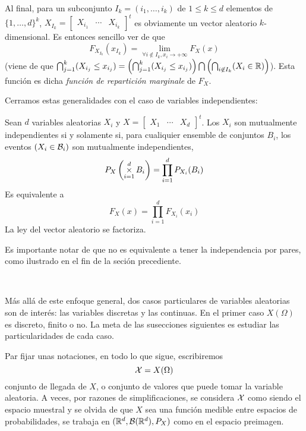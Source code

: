 %
Al  final, para  un subconjunto  $I_k =  (i_1,\ldots,i_k)$ de  $1 \le  k  \le d$
elementos de  $\{ 1  , \ldots ,  d \}^k$,  $X_{I_k} = \begin{bmatrix}  X_{i_1} &
  \cdots   &   X_{i_k}\end{bmatrix}^t$  es   obviamente   un  vector   aleatorio
$k$-dimensional. Es entonces sencillo ver de que
%
\[
F_{X_{I_k}}(x_{I_k}) = \lim_{\forall i \not\in I_k, x_i \to +\infty} F_X(x)
\label{pagina:MP:MarginalesF}
\]
%
(viene de  que $\bigcap_{j=1}^k (X_{i_j}  \le x_{i_j}) =  \left( \bigcap_{j=1}^k
  (X_{i_j} \le x_{i_j}) \right) \bigcap  \left( \bigcap_{i \not\in I_k} (X_i \in
  \mathbb{R})  \right)$). Esta  funci\'on es  dicha {\it  funci\'on  de repartici\'on
  marginale} de $F_X$.

Cerramos estas generalidades con el caso de variables independientes:
%
\begin{definicion}[Independencia]
  Sean $d$  variables aleatorias  $X_i$ y  $X = \begin{bmatrix}  X_1 &  \cdots &
    X_d  \end{bmatrix}^t$.   Los  $X_i$  son  mutualmente  independientes  si  y
  solamente si, para  cualiquier ensemble de conjuntos $B_i$,  los eventos $(X_i
  \in \mathcal{B}_i)$ son mutualmente independientes, \ie
  \[
  P_X\left( \operatorname*{\times}_{i=1}^d B_i \right) = \prod_{i=1}^d P_{X_i}(B_i)
  \]
  Es equivalente a
  \[
  F_X(x) = \prod_{i=1}^d F_{X_i}(x_i)
  \]
  La ley del vector aleatorio se factoriza.
\end{definicion}
%
Es importante notar de que no es equivalente a tener la independencia por pares,
como ilustrado en el fin de la seci\'on precediente.

\

M\'as  all\'a de  este  enfoque  general, dos  casos  particulares de  variables
aleatorias son  de inter\'es:  las variables discretas  y las continuas.   En el
primer caso  $X(\Omega)$ es discreto, finito  o no.  La meta  de las susecciones
siguientes es estudiar las particularidades de cada caso.

Par fijar unas notaciones, en todo lo que sigue, escribiremos
%
\[
\mathcal{X} = X(\Omega)
\]
%
conjunto de  llegada de $X$, o conjunto  de valores que puede  tomar la variable
aleatoria.  A  veces, por  razones de simplificaciones,  se considera  $\mathcal{X}$ como
siendo el  espacio muestral  y se olvida  de que  $X$ sea una  funci\'on medible
entre espacios de probabilidades,  \ie se trabaja en $(\mathbb{R}^d,\mathcal{B}(\mathbb{R}^d),P_X)$
como en el espacio preimagen.



